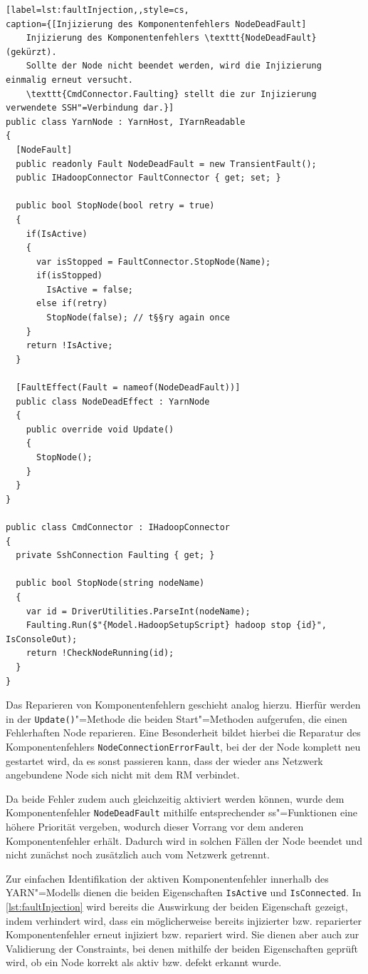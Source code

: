 \begin{lstlisting}[label=lst:faultInjection,,style=cs,
caption={[Injizierung des Komponentenfehlers NodeDeadFault]
    Injizierung des Komponentenfehlers \texttt{NodeDeadFault} (gekürzt).
    Sollte der Node nicht beendet werden, wird die Injizierung einmalig erneut versucht.
    \texttt{CmdConnector.Faulting} stellt die zur Injizierung verwendete SSH"=Verbindung dar.}]
public class YarnNode : YarnHost, IYarnReadable
{
  [NodeFault]
  public readonly Fault NodeDeadFault = new TransientFault();
  public IHadoopConnector FaultConnector { get; set; }
  
  public bool StopNode(bool retry = true)
  {
    if(IsActive)
    {
      var isStopped = FaultConnector.StopNode(Name);
      if(isStopped)
        IsActive = false;
      else if(retry)
        StopNode(false); // t§§ry again once
    }
    return !IsActive;
  }
  
  [FaultEffect(Fault = nameof(NodeDeadFault))]
  public class NodeDeadEffect : YarnNode
  {
    public override void Update()
    {
      StopNode();
    }
  }
}

public class CmdConnector : IHadoopConnector
{
  private SshConnection Faulting { get; }
  
  public bool StopNode(string nodeName)
  {
    var id = DriverUtilities.ParseInt(nodeName);
    Faulting.Run($"{Model.HadoopSetupScript} hadoop stop {id}", IsConsoleOut);
    return !CheckNodeRunning(id);
  }
}
\end{lstlisting}

Das Reparieren von Komponentenfehlern geschieht analog hierzu.
Hierfür werden in der \texttt{Update()}"=Methode die beiden Start"=Methoden aufgerufen, die einen Fehlerhaften Node reparieren.
Eine Besonderheit bildet hierbei die Reparatur des Komponentenfehlers \texttt{NodeConnectionErrorFault}, bei der der Node komplett neu gestartet wird, da es sonst passieren kann, dass der wieder ans Netzwerk angebundene Node sich nicht mit dem \gls{RM} verbindet.

Da beide Fehler zudem auch gleichzeitig aktiviert werden können, wurde dem Komponentenfehler \texttt{NodeDeadFault} mithilfe entsprechender \gls{ss}"=Funktionen eine höhere Priorität vergeben, wodurch dieser Vorrang vor dem anderen Komponentenfehler erhält.
Dadurch wird in solchen Fällen der Node beendet und nicht zunächst noch zusätzlich auch vom Netzwerk getrennt.

Zur einfachen Identifikation der aktiven Komponentenfehler innerhalb des \gls{YARN}"=Modells dienen die beiden Eigenschaften \texttt{IsActive} und \texttt{IsConnected}.
In \cref{lst:faultInjection} wird bereits die Auswirkung der beiden Eigenschaft gezeigt, indem verhindert wird, dass ein möglicherweise bereits injizierter bzw. reparierter Komponentenfehler erneut injiziert bzw. repariert wird.
Sie dienen aber auch zur Validierung der Constraints, bei denen mithilfe der beiden Eigenschaften geprüft wird, ob ein Node korrekt als aktiv bzw. defekt erkannt wurde.

